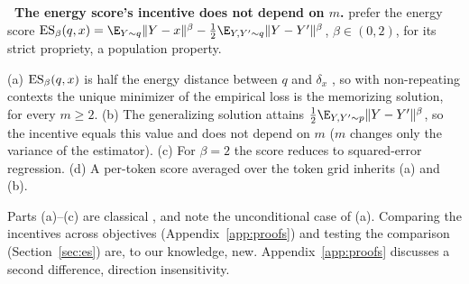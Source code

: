 \leavevmode{}\textbf{\thesubsection\ The energy score's incentive does not depend on $m$.}
\label{sec:theory_es}
\citet{makabe2026esp} prefer the energy score $\IS_\beta(q, x) = \E_{Y \sim q}\|Y - x\|^\beta - \tfrac{1}{2}\E_{Y, Y' \sim q}\|Y - Y'\|^\beta$, $\beta \in (0,2)$, for its strict propriety, a population property.
\begin{proposition}
\label{prop:es}
(a) $\mathrm{ES}_\beta(q, x)$ is half the energy distance between $q$ and $\delta_x$ \citep{dawid2007geometry,gneiting2007strictly}, so with non-repeating contexts the unique minimizer of the empirical loss is the memorizing solution, for every $m \ge 2$. (b) The generalizing solution attains $\tfrac{1}{2}\E_{Y,Y' \sim p}\|Y - Y'\|^\beta$, so the incentive equals this value and does not depend on $m$ ($m$ changes only the variance of the estimator). (c) For $\beta = 2$ the score reduces to squared-error regression. (d) A per-token score averaged over the token grid inherits (a) and (b).
\end{proposition}
Parts (a)--(c) are classical \citep{gneiting2007strictly,dawid2007geometry}, and \citet{li2018imle} note the unconditional case of (a). Comparing the incentives across objectives (Appendix~\ref{app:proofs}) and testing the comparison (Section~\ref{sec:es}) are, to our knowledge, new. Appendix~\ref{app:proofs} discusses a second difference, direction insensitivity.

